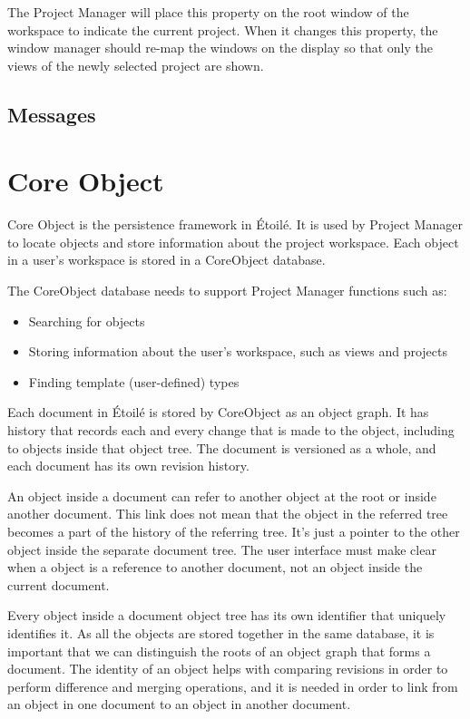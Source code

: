 \documentclass[11pt]{report}
\newcommand{\etoile}{\'Etoil\'e\xspace}
\newcommand{\proman}{Project Manager\xspace}
\begin{document}
The \proman will place this property on the root window of the workspace to indicate the current project. When it changes this property, the window manager should re-map the windows on the display so that only the views of the newly selected project are shown.

\subsection{Messages}

\section{Core Object}
Core Object is the persistence framework in \etoile. It is used by \proman to locate objects and store information about the project workspace. Each object in a user's workspace is stored in a CoreObject database.

The CoreObject database needs to support \proman functions such as:
\begin{itemize}
\item Searching for objects
\item Storing information about the user's workspace, such as views and projects
\item Finding template (user-defined) types
\end{itemize}

Each document in \etoile is stored by CoreObject as an object graph. It has history that records each and every change that is made to the object, including to objects inside that object tree.  The document is versioned as a whole, and each document has its own revision history.

An object inside a document can refer to another object at the root or inside another document. This link does not mean that the object in the referred tree becomes a part of the history of the referring tree. It's just a pointer to the other object inside the separate document tree. The user interface must make clear when a object is a reference to another document, not an object inside the current document.

Every object inside a document object tree has its own identifier that uniquely identifies it. As all the objects are stored together in the same database, it is important that we can distinguish the roots of an object graph that forms a document. The identity of an object helps with comparing revisions in order to perform difference and merging operations, and it is needed in order to link from an object in one document to an object in another document.
\end{document}

